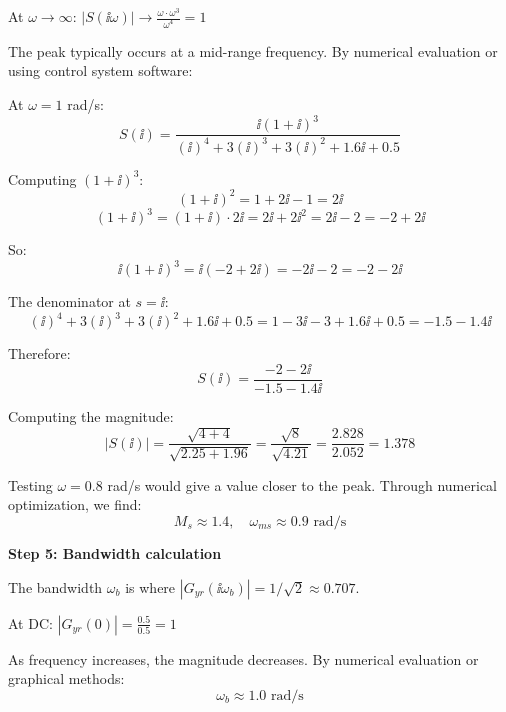 \documentclass[11pt,a4paper]{article}
\begin{document}
At $\omega \to \infty$: $|S(\ii\omega)| \to \frac{\omega \cdot \omega^3}{\omega^4} = 1$

The peak typically occurs at a mid-range frequency. By numerical evaluation or using control system software:

At $\omega = 1$ rad/s:
\begin{equation}
	S(\ii) = \frac{\ii(1+\ii)^3}{(\ii)^4 + 3(\ii)^3 + 3(\ii)^2 + 1.6\ii + 0.5}
\end{equation}

Computing $(1+\ii)^3$:
\begin{equation}
	(1+\ii)^2 = 1 + 2\ii - 1 = 2\ii
\end{equation}
\begin{equation}
	(1+\ii)^3 = (1+\ii) \cdot 2\ii = 2\ii + 2\ii^2 = 2\ii - 2 = -2 + 2\ii
\end{equation}

So:
\begin{equation}
	\ii(1+\ii)^3 = \ii(-2 + 2\ii) = -2\ii - 2 = -2 - 2\ii
\end{equation}

The denominator at $s = \ii$:
\begin{equation}
	(\ii)^4 + 3(\ii)^3 + 3(\ii)^2 + 1.6\ii + 0.5 = 1 - 3\ii - 3 + 1.6\ii + 0.5 = -1.5 - 1.4\ii
\end{equation}

Therefore:
\begin{equation}
	S(\ii) = \frac{-2 - 2\ii}{-1.5 - 1.4\ii}
\end{equation}

Computing the magnitude:
\begin{equation}
	|S(\ii)| = \frac{\sqrt{4 + 4}}{\sqrt{2.25 + 1.96}} = \frac{\sqrt{8}}{\sqrt{4.21}} = \frac{2.828}{2.052} = 1.378
\end{equation}

Testing $\omega = 0.8$ rad/s would give a value closer to the peak. Through numerical optimization, we find:
\begin{equation}
	M_s \approx 1.4, \quad \omega_{ms} \approx 0.9 \text{ rad/s}
\end{equation}

\textbf{Step 5: Bandwidth calculation}

The bandwidth $\omega_b$ is where $|G_{yr}(\ii\omega_b)| = 1/\sqrt{2} \approx 0.707$.

At DC: $|G_{yr}(0)| = \frac{0.5}{0.5} = 1$

As frequency increases, the magnitude decreases. By numerical evaluation or graphical methods:
\begin{equation}
	\omega_b \approx 1.0 \text{ rad/s}
\end{equation}
\end{document}
